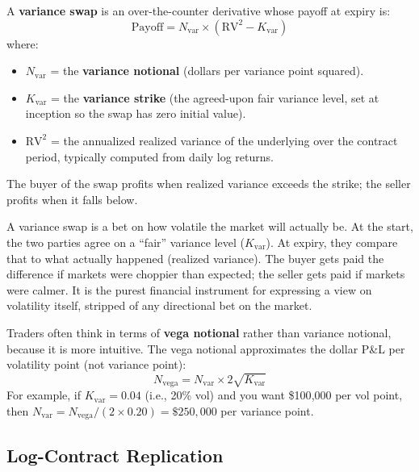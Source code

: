 \begin{definition}
A \textbf{variance swap} is an over-the-counter derivative whose payoff at expiry is:
\begin{equation}
  \text{Payoff} = N_{\text{var}} \times (\text{RV}^2 - K_{\text{var}})
  \label{eq:varswap-payoff}
\end{equation}
where:
\begin{itemize}[nosep]
  \item $N_{\text{var}}$ = the \textbf{variance notional} (dollars per variance point squared).
  \item $K_{\text{var}}$ = the \textbf{variance strike} (the agreed-upon fair variance level, set at inception so the swap has zero initial value).
  \item $\text{RV}^2$ = the annualized realized variance of the underlying over the contract period, typically computed from daily log returns.
\end{itemize}
The buyer of the swap profits when realized variance exceeds the strike; the seller profits when it falls below.
\end{definition}

\begin{intuition}
A variance swap is a bet on how volatile the market will actually be.
At the start, the two parties agree on a ``fair'' variance level ($K_{\text{var}}$).
At expiry, they compare that to what actually happened (realized variance).
The buyer gets paid the difference if markets were choppier than expected; the seller gets paid if markets were calmer.
It is the purest financial instrument for expressing a view on volatility itself, stripped of any directional bet on the market.
\end{intuition}

Traders often think in terms of \textbf{vega notional} rather than variance notional, because it is more intuitive.
The vega notional approximates the dollar P\&L per volatility point (not variance point):
\begin{equation}
  N_{\text{vega}} = N_{\text{var}} \times 2\sqrt{K_{\text{var}}}
  \label{eq:vega-notional}
\end{equation}
For example, if $K_{\text{var}} = 0.04$ (i.e., 20\% vol) and you want \$100{,}000 per vol point, then $N_{\text{var}} = N_{\text{vega}} / (2 \times 0.20) = \$250{,}000$ per variance point.

\subsection{Log-Contract Replication}

